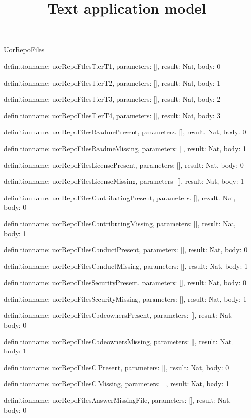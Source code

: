 \begin{lexlean}{UorRepoFiles}
\title{Text application model}
\begin{semanticmodule}
definition{name: uorRepoFilesTierT1, parameters: [], result: Nat, body: 0}

definition{name: uorRepoFilesTierT2, parameters: [], result: Nat, body: 1}

definition{name: uorRepoFilesTierT3, parameters: [], result: Nat, body: 2}

definition{name: uorRepoFilesTierT4, parameters: [], result: Nat, body: 3}

definition{name: uorRepoFilesReadmePresent, parameters: [], result: Nat, body: 0}

definition{name: uorRepoFilesReadmeMissing, parameters: [], result: Nat, body: 1}

definition{name: uorRepoFilesLicensePresent, parameters: [], result: Nat, body: 0}

definition{name: uorRepoFilesLicenseMissing, parameters: [], result: Nat, body: 1}

definition{name: uorRepoFilesContributingPresent, parameters: [], result: Nat, body: 0}

definition{name: uorRepoFilesContributingMissing, parameters: [], result: Nat, body: 1}

definition{name: uorRepoFilesConductPresent, parameters: [], result: Nat, body: 0}

definition{name: uorRepoFilesConductMissing, parameters: [], result: Nat, body: 1}

definition{name: uorRepoFilesSecurityPresent, parameters: [], result: Nat, body: 0}

definition{name: uorRepoFilesSecurityMissing, parameters: [], result: Nat, body: 1}

definition{name: uorRepoFilesCodeownersPresent, parameters: [], result: Nat, body: 0}

definition{name: uorRepoFilesCodeownersMissing, parameters: [], result: Nat, body: 1}

definition{name: uorRepoFilesCiPresent, parameters: [], result: Nat, body: 0}

definition{name: uorRepoFilesCiMissing, parameters: [], result: Nat, body: 1}

definition{name: uorRepoFilesAnswerMissingFile, parameters: [], result: Nat, body: 0}


\end{semanticmodule}
\end{lexlean}
